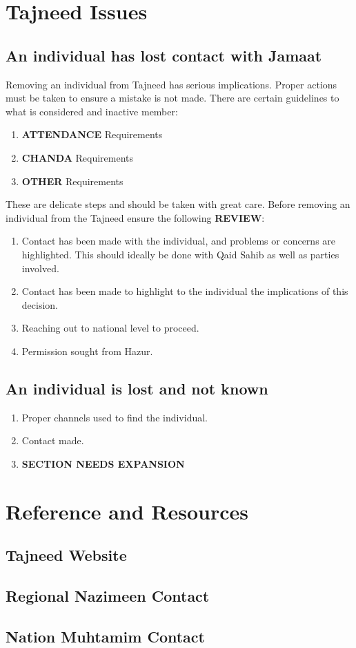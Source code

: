 \documentclass[11pt]{article}
\begin{document}
\section{Tajneed Issues}
\label{sec:org8f66a51}
\subsection{An individual has lost contact with Jamaat}
\label{sec:org900b36d}
Removing an individual from Tajneed has serious implications. Proper
actions must be taken to ensure a mistake is not made. There are
certain guidelines to what is considered and inactive member:

\begin{enumerate}
\item \textbf{ATTENDANCE} Requirements
\item \textbf{CHANDA} Requirements
\item \textbf{OTHER} Requirements
\end{enumerate}

These are delicate steps and should be taken with great care. Before
removing an individual from the Tajneed ensure the following \textbf{REVIEW}:
\begin{enumerate}
\item Contact has been made with the individual, and problems or concerns
are highlighted. This should ideally be done with Qaid Sahib as
well as parties involved.
\item Contact has been made to highlight to the individual the
implications of this decision.
\item Reaching out to national level to proceed.
\item Permission sought from Hazur.
\end{enumerate}

\subsection{An individual is lost and not known}
\label{sec:orgdcf5bbd}
\begin{enumerate}
\item Proper channels used to find the individual.
\item Contact made.
\item \textbf{SECTION NEEDS EXPANSION}
\end{enumerate}


\section{Reference and Resources}
\label{sec:orgbacef38}
\subsection{Tajneed Website}
\label{sec:org440cb66}
\subsection{Regional Nazimeen Contact}
\label{sec:org17e64eb}
\subsection{Nation Muhtamim Contact}
\label{sec:org67020fb}
\end{document}
